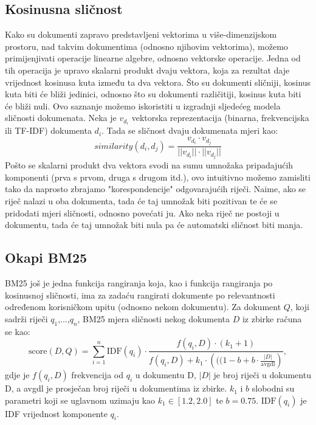 \documentclass[times, utf8, zavrsni]{fer}
\begin{document}
\subsection{Kosinusna sličnost}
Kako su dokumenti zapravo predstavljeni vektorima u više-dimenzijskom prostoru, nad takvim dokumentima (odnosno njihovim vektorima), možemo primijenjivati operacije linearne algebre, odnosno vektorske operacije. Jedna od tih operacija je upravo skalarni produkt dvaju vektora, koja za rezultat daje vrijednost kosinusa kuta između ta dva vektora. Što su dokumenti sličniji, kosinus kuta biti će bliži jedinici, odnosno što su dokumenti različitiji, kosinus kuta biti će bliži nuli. Ovo saznanje možemo iskoristiti u izgradnji sljedećeg modela sličnosti dokumenata. Neka je $v_{d_i}$ vektorska reprezentacija (binarna, frekvencijska ili TF-IDF) dokumenta $d_{i}$. Tada se sličnost dvaju dokumenata mjeri kao:
\begin{equation}
{\displaystyle similarity(d_{i}, d_{j}) = \frac{v_{d_i} \cdot v_{d_j}}{||v_{d_i}|| \cdot ||v_{d_j}||}}
\end{equation}
Pošto se skalarni produkt dva vektora svodi na sumu umnožaka pripadajućih komponenti (prva s prvom, druga s drugom itd.), ovo intuitivno možemo zamisliti tako da naprosto zbrajamo "korespondencije" odgovarajućih riječi. Naime, ako se riječ nalazi u oba dokumenta, tada će taj umnožak biti pozitivan te će se pridodati mjeri sličnosti, odnosno povećati ju. Ako neka riječ ne postoji u dokumentu, tada će taj umnožak biti nula pa će automatski sličnost biti manja. 

\subsection{Okapi BM25}
BM25 još je jedna funkcija rangiranja koja, kao i funkcija rangiranja po kosinusnoj sličnosti, ima za zadaću rangirati dokumente po relevantnosti određenom korisničkom upitu (odnosno nekom dokumentu).
Za dokument $Q$, koji sadrži riječi $q_{1}$,...,$q_{n}$, BM25 mjera sličnosti nekog dokumenta $D$ iz zbirke računa se kao:
\begin{equation}
{\displaystyle {\text{score}}(D,Q)=\sum _{i=1}^{n}{\text{IDF}}(q_{i})\cdot {\frac {f(q_{i},D)\cdot (k_{1}+1)}{f(q_{i},D)+k_{1}\cdot \left(((1-b+b\cdot {\frac {|D|}{\text{avgdl}}}\right)}},}
\end{equation}
gdje je ${\displaystyle f(q_{i},D)}$	 frekvencija od ${\displaystyle q_{i}}$ u dokumentu D, ${\displaystyle |D|}$ je broj riječi u dokumentu D, a avgdl je prosječan broj riječi u dokumentima iz zbirke. ${\displaystyle k_{1}}$ i $b$ slobodni su parametri koji se uglavnom uzimaju kao ${\displaystyle k_{1}\in [1.2,2.0]}$ te ${\displaystyle b=0.75}.{\displaystyle {\text{ IDF}}(q_{i})}$ je IDF vrijednost komponente ${\displaystyle q_{i}}.$
\end{document}
